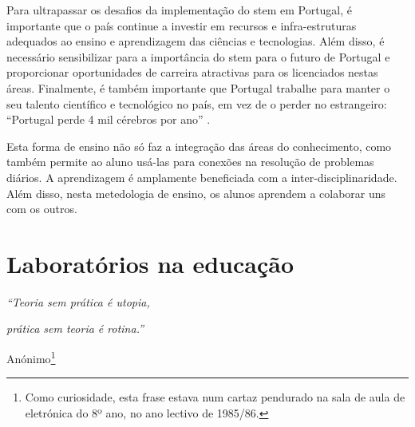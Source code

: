 Para ultrapassar os desafios da implementação do \acrshort{stem} em Portugal, é importante que o país continue a investir em recursos e infra-estruturas adequados ao ensino e aprendizagem das ciências e tecnologias. Além disso, é necessário sensibilizar para a importância do \acrshort{stem} para o futuro de Portugal e proporcionar oportunidades de carreira atractivas para os licenciados nestas áreas. Finalmente, é também importante que Portugal trabalhe para manter o seu talento científico e tecnológico no país, em vez de o perder no estrangeiro: ``Portugal perde 4 mil cérebros por ano'' \cite{Cerdeira2020}.






Esta forma de ensino não só faz a integração das áreas do conhecimento, como também permite ao aluno usá-las para conexões na resolução de problemas diários. A aprendizagem é amplamente beneficiada com a inter-disciplinaridade. Além disso, nesta metedologia de ensino, os alunos aprendem a colaborar uns com os outros.


\section{Laboratórios na educação}
\label{Laboratóriosnaeducação}

\begin{center}
    \textit{``Teoria sem prática é utopia,}

    \textit{prática sem teoria é rotina.''}

    Anónimo\footnote{Como curiosidade, esta frase estava num cartaz pendurado na sala de aula de eletrónica do 8º ano, no ano lectivo de 1985/86.}
\end{center}

